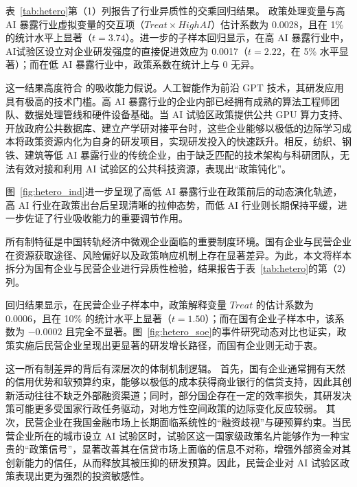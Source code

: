 \documentclass[12pt,hyperref,a4paper,UTF8]{ctexart}
\begin{document}
表~\ref{tab:hetero}第（1）列报告了行业异质性的交乘回归结果。
政策处理变量与高 AI 暴露行业虚拟变量的交互项（$Treat \times HighAI$）估计系数为 0.0028，且在 1\% 的统计水平上显著（$t = 3.74$）。进一步的子样本回归显示，在高 AI 暴露行业中，AI试验区设立对企业研发强度的直接促进效应为 0.0017（$t = 2.22$，在 5\% 水平显著）；而在低 AI 暴露行业中，政策系数在统计上与 0 无异。

这一结果高度符合 \textcite{cohen1990absorptive} 的吸收能力假说。人工智能作为前沿 GPT 技术，其研发应用具有极高的技术门槛。高 AI 暴露行业的企业内部已经拥有成熟的算法工程师团队、数据处理管线和硬件设备基础。当 AI 试验区政策提供公共 GPU 算力支持、开放政府公共数据库、建立产学研对接平台时，这些企业能够以极低的边际学习成本将政策资源内化为自身的研发项目，实现研发投入的快速跃升。相反，纺织、钢铁、建筑等低 AI 暴露行业的传统企业，由于缺乏匹配的技术架构与科研团队，无法有效对接和利用 AI 试验区的公共科技资源，表现出“政策钝化”。

图~\ref{fig:hetero_ind}进一步呈现了高低 AI 暴露行业在政策前后的动态演化轨迹，高 AI 行业在政策出台后呈现清晰的拉伸态势，而低 AI 行业则长期保持平缓，进一步佐证了行业吸收能力的重要调节作用。



所有制特征是中国转轨经济中微观企业面临的重要制度环境。国有企业与民营企业在资源获取途径、风险偏好以及政策响应机制上存在显著差异。为此，本文将样本拆分为国有企业与民营企业进行异质性检验，结果报告于表~\ref{tab:hetero}的第（2）列。

回归结果显示，在民营企业子样本中，政策解释变量 $Treat$ 的估计系数为 0.0006，且在 10\% 的统计水平上显著（$t = 1.50$）；而在国有企业子样本中，该系数为 $-0.0002$ 且完全不显著。图~\ref{fig:hetero_soe}的事件研究动态对比也证实，政策实施后民营企业呈现出更显著的研发增长路径，而国有企业则无动于衷。

这一所有制差异的背后有深层次的体制机制逻辑。
首先，国有企业通常拥有天然的信用优势和软预算约束，能够以极低的成本获得商业银行的信贷支持，因此其创新活动往往不缺乏外部融资渠道；同时，部分国企存在一定的效率损失，其研发决策可能更多受国家行政任务驱动，对地方性空间政策的边际变化反应较弱。
其次，民营企业在我国金融市场上长期面临系统性的“融资歧视”与硬预算约束。当民营企业所在的城市设立 AI 试验区时，试验区这一国家级政策名片能够作为一种宝贵的“政策信号”，显著改善其在信贷市场上面临的信息不对称，增强外部资金对其创新能力的信任，从而释放其被压抑的研发预算。因此，民营企业对 AI 试验区政策表现出更为强烈的投资敏感性。
\end{document}
